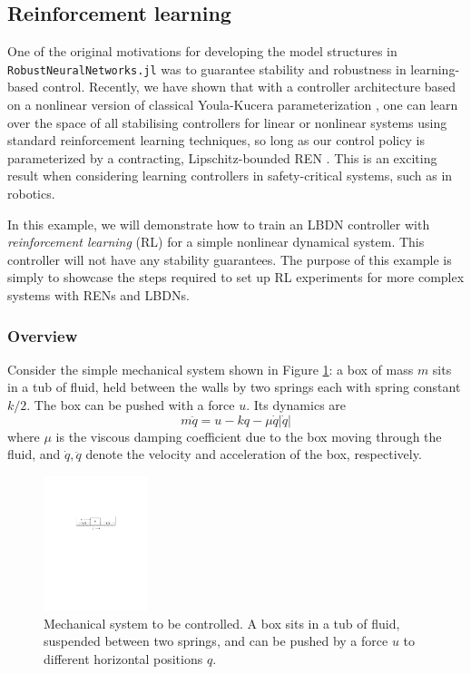 \subsection{Reinforcement learning} \label{sec:rl}

One of the original motivations for developing the model structures in  \verb|RobustNeuralNetworks.jl| was to guarantee stability and robustness in learning-based control. Recently, we have shown that with a controller architecture based on a nonlinear version of classical Youla-Kucera parameterization \cite{Youla++1976}, one can learn over the space of all stabilising controllers for linear or nonlinear systems using standard reinforcement learning techniques, so long as our control policy is parameterized by a contracting, Lipschitz-bounded REN  \cite{Wang++2022,Barbara++2023}. This is an exciting result when considering learning controllers in safety-critical systems, such as in robotics.

In this example, we will demonstrate how to train an LBDN controller with \textit{reinforcement learning} (RL) for a simple nonlinear dynamical system. This controller will not have any stability guarantees. The purpose of this example is simply to showcase the steps required to set up RL experiments for more complex systems with RENs and LBDNs.

\subsubsection{Overview} \label{sec:rl-overview}

Consider the simple mechanical system shown in Figure \ref{fig:rl-box}: a box of mass $m$ sits in a tub of fluid, held between the walls by two springs each with spring constant $k/2.$ The box can be pushed with a force $u.$ Its dynamics are
\begin{equation} \label{eqn:box-dynamics}
m\ddot{q} = u - kq - \mu \dot{q}|\dot{q}|
\end{equation}
where $\mu$ is the viscous damping coefficient due to the box moving through the fluid, and $\dot{q},\ddot{q}$ denote the velocity and acceleration of the box, respectively.

\begin{figure}[!t]
    \centering
    \includegraphics[width=0.27\textwidth]{Images/mass_rl.pdf}
    \caption{Mechanical system to be controlled. A box sits in a tub of fluid, suspended between two springs, and can be pushed by a force $u$ to different horizontal positions $q$.}
    \label{fig:rl-box}
\end{figure}

